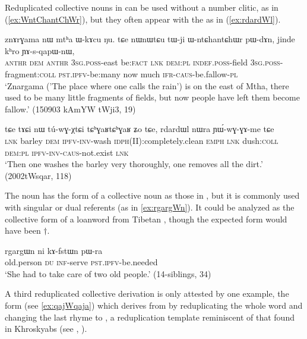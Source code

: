 Reduplicated collective nouns in  can be used without a number clitic, as in (\ref{ex:WntChantChWr}), but they often appear with the  as in (\ref{ex:rdardWl}).

\begin{exe}
\ex \label{ex:WntChantChWr}
\gll znɤrɣama nɯ mtʰa ɯ-kɤcu ŋu. tɕe nɯnɯtɕu tɯ-ji ɯ-ntɕhantɕhɯr pɯ-dɤn, jinde kʰro ɲɤ-s-qapɯ-nɯ,\\
\textsc{anthr} \textsc{dem}  \textsc{anthr} \textsc{3sg}.\textsc{poss}-east be:\textsc{fact} \textsc{lnk} \textsc{dem}:\textsc{pl} \textsc{indef}.\textsc{poss}-field \textsc{3sg}.\textsc{poss}-fragment:\textsc{coll} \textsc{pst}.\textsc{ipfv}-be:many now much \textsc{ifr}-\textsc{caus}-be.fallow-\textsc{pl}\\
\glt `Znargama ('The place where one calls the rain') is on the east of Mtha, there used to be many little fragments of fields, but now people have left them become fallow.' (150903 kAmYW tWji3, 19)
\end{exe}

\begin{exe}
\ex \label{ex:rdardWl}
\gll tɕe tɤɕi nɯ tú-wɣ-χtɕi tɕʰɣaʁtɕʰɣaʁ ʑo tɕe, rdardɯl nɯra ɲɯ́-wɣ-ɣɤ-me tɕe \\
\textsc{lnk} barley \textsc{dem} \textsc{ipfv}-\textsc{inv}-wash \textsc{idph}(II):completely.clean \textsc{emph} \textsc{lnk} dush:\textsc{coll} \textsc{dem}:\textsc{pl} \textsc{ipfv}-\textsc{inv}-\textsc{caus}-not.exist \textsc{lnk} \\
\glt `Then one washes the barley very thoroughly, one removes all the dirt.' (2002tWsqar, 118)
\end{exe}
 
The noun  has the form of a collective noun as those in , but it is commonly used with singular or dual referents (as in \ref{ex:rgargWn}). It could be analyzed as the collective form of a loanword from Tibetan , though the expected form would have been $\dagger$. 
 
\begin{exe}
\ex \label{ex:rgargWn}
\gll  rgargɯn ni kɤ-fstɯn pɯ-ra \\
old.person \textsc{du} \textsc{inf}-serve \textsc{pst}.\textsc{ipfv}-be.needed \\
\glt `She had to take care of two old people.' (14-siblings, 34)
\end{exe}

A third reduplicated collective derivation is only attested by one example, the form  (see \ref{ex:qajWqaja}) which derives from   by reduplicating the whole word and changing the last rhyme to , a reduplication template reminiscent of that found in Khroskyabs (see \citealt{lai13fuyin}, \citealt[22--24]{lai17khroskyabs}).

